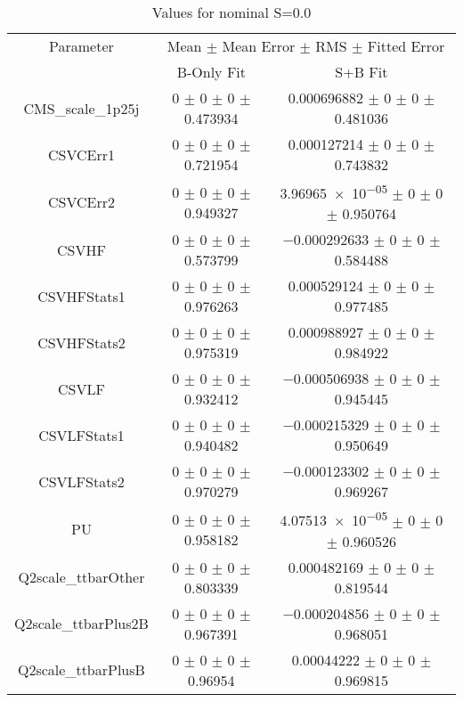 \begin{table}
\centering
\caption{Values for nominal S=0.0}
\begin{tabular}{ccc}
\toprule
Parameter & \multicolumn{2}{c}{Mean $\pm$ Mean Error $\pm$ RMS $\pm$ Fitted Error}\\
 & B-Only Fit & S+B Fit\\
\midrule
CMS\_scale\_1p25j & \num{0} $\pm$ \num{0} $\pm$ \num{0} $\pm$ \num{0.473934} & \num{0.000696882} $\pm$ \num{0} $\pm$ \num{0} $\pm$ \num{0.481036}\\
CSVCErr1 & \num{0} $\pm$ \num{0} $\pm$ \num{0} $\pm$ \num{0.721954} & \num{0.000127214} $\pm$ \num{0} $\pm$ \num{0} $\pm$ \num{0.743832}\\
CSVCErr2 & \num{0} $\pm$ \num{0} $\pm$ \num{0} $\pm$ \num{0.949327} & \num{3.96965e-05} $\pm$ \num{0} $\pm$ \num{0} $\pm$ \num{0.950764}\\
CSVHF & \num{0} $\pm$ \num{0} $\pm$ \num{0} $\pm$ \num{0.573799} & \num{-0.000292633} $\pm$ \num{0} $\pm$ \num{0} $\pm$ \num{0.584488}\\
CSVHFStats1 & \num{0} $\pm$ \num{0} $\pm$ \num{0} $\pm$ \num{0.976263} & \num{0.000529124} $\pm$ \num{0} $\pm$ \num{0} $\pm$ \num{0.977485}\\
CSVHFStats2 & \num{0} $\pm$ \num{0} $\pm$ \num{0} $\pm$ \num{0.975319} & \num{0.000988927} $\pm$ \num{0} $\pm$ \num{0} $\pm$ \num{0.984922}\\
CSVLF & \num{0} $\pm$ \num{0} $\pm$ \num{0} $\pm$ \num{0.932412} & \num{-0.000506938} $\pm$ \num{0} $\pm$ \num{0} $\pm$ \num{0.945445}\\
CSVLFStats1 & \num{0} $\pm$ \num{0} $\pm$ \num{0} $\pm$ \num{0.940482} & \num{-0.000215329} $\pm$ \num{0} $\pm$ \num{0} $\pm$ \num{0.950649}\\
CSVLFStats2 & \num{0} $\pm$ \num{0} $\pm$ \num{0} $\pm$ \num{0.970279} & \num{-0.000123302} $\pm$ \num{0} $\pm$ \num{0} $\pm$ \num{0.969267}\\
PU & \num{0} $\pm$ \num{0} $\pm$ \num{0} $\pm$ \num{0.958182} & \num{4.07513e-05} $\pm$ \num{0} $\pm$ \num{0} $\pm$ \num{0.960526}\\
Q2scale\_ttbarOther & \num{0} $\pm$ \num{0} $\pm$ \num{0} $\pm$ \num{0.803339} & \num{0.000482169} $\pm$ \num{0} $\pm$ \num{0} $\pm$ \num{0.819544}\\
Q2scale\_ttbarPlus2B & \num{0} $\pm$ \num{0} $\pm$ \num{0} $\pm$ \num{0.967391} & \num{-0.000204856} $\pm$ \num{0} $\pm$ \num{0} $\pm$ \num{0.968051}\\
Q2scale\_ttbarPlusB & \num{0} $\pm$ \num{0} $\pm$ \num{0} $\pm$ \num{0.96954} & \num{0.00044222} $\pm$ \num{0} $\pm$ \num{0} $\pm$ \num{0.969815}\\

\end{tabular}
\end{table}
